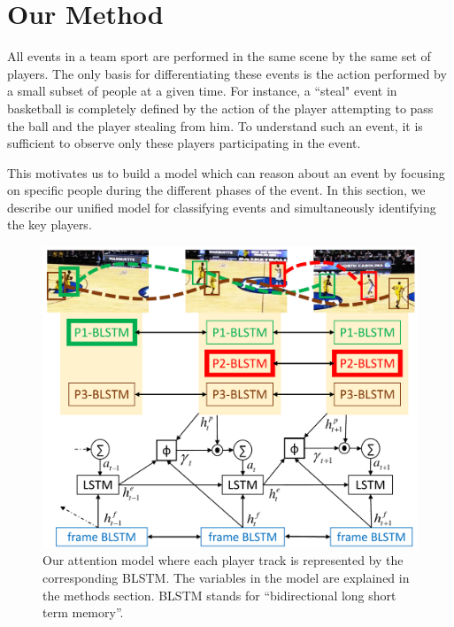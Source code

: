 \section{Our Method}
\label{sec:methods}

All events in a team sport are performed in the same scene by the same set
of players. The only basis for differentiating these events is the action
performed by a small subset of people at a given time.  For instance, a
``steal" event in basketball is completely defined by the action of the player attempting to
pass the ball and the player stealing from him.  To understand such an event,
it is sufficient to observe only these players participating in the event.

This motivates us to build a model which can reason about an event by focusing
on specific people during the different phases of the event.
In this section, we describe our unified model for classifying events
and simultaneously identifying the key players.

\begin{figure}[t!]
\begin{center}
    \includegraphics[width=3 in]{images/system_figure_1_cropped_v2.pdf}
\end{center}
   \caption{Our attention model where each player track is represented by the
     corresponding BLSTM. The variables in the model are explained in the
     methods section.  BLSTM stands for ``bidirectional long short term memory''.
}
\label{fig:model}
\end{figure}

